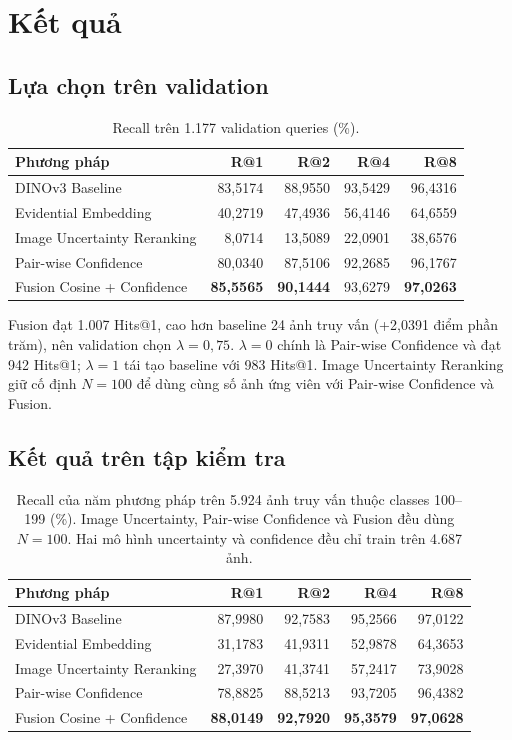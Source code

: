 \documentclass[11pt,a4paper]{article}
\begin{document}
\section{Kết quả}
\subsection{Lựa chọn trên validation}
\begin{table}[htbp]
\centering
\caption{Recall trên 1.177 validation queries (\%).}
\begin{tabular}{@{}lrrrr@{}}
\toprule Phương pháp & R@1 & R@2 & R@4 & R@8\\ \midrule
DINOv3 Baseline & 83,5174 & 88,9550 & 93,5429 & 96,4316\\
Evidential Embedding & 40,2719 & 47,4936 & 56,4146 & 64,6559\\
Image Uncertainty Reranking & 8,0714 & 13,5089 & 22,0901 & 38,6576\\
Pair-wise Confidence & 80,0340 & 87,5106 & 92,2685 & 96,1767\\
Fusion Cosine + Confidence & \textbf{85,5565} & \textbf{90,1444} & 93,6279 & \textbf{97,0263}\\
\bottomrule
\end{tabular}
\end{table}
Fusion đạt 1.007 Hits@1, cao hơn baseline 24 ảnh truy vấn (+2,0391 điểm phần trăm),
nên validation chọn $\lambda=0{,}75$. $\lambda=0$ chính là Pair-wise
Confidence và đạt 942 Hits@1; $\lambda=1$ tái tạo baseline với 983 Hits@1.
Image Uncertainty Reranking giữ cố định $N=100$ để dùng cùng số ảnh ứng viên
với Pair-wise Confidence và Fusion.

\subsection{Kết quả trên tập kiểm tra}
\begin{table}[htbp]
\centering
\caption{Recall của năm phương pháp trên 5.924 ảnh truy vấn thuộc classes
100--199 (\%). Image Uncertainty, Pair-wise Confidence và Fusion đều dùng
$N=100$. Hai mô hình uncertainty và confidence đều chỉ train trên 4.687 ảnh.}
\label{tab:e2b-results}
\begin{tabular}{@{}lrrrr@{}}
\toprule Phương pháp & R@1 & R@2 & R@4 & R@8\\ \midrule
DINOv3 Baseline & 87,9980 & 92,7583 & 95,2566 & 97,0122\\
Evidential Embedding & 31,1783 & 41,9311 & 52,9878 & 64,3653\\
Image Uncertainty Reranking & 27,3970 & 41,3741 & 57,2417 & 73,9028\\
Pair-wise Confidence & 78,8825 & 88,5213 & 93,7205 & 96,4382\\
Fusion Cosine + Confidence & \textbf{88,0149} & \textbf{92,7920} & \textbf{95,3579} & \textbf{97,0628}\\
\bottomrule
\end{tabular}
\end{table}
\end{document}
